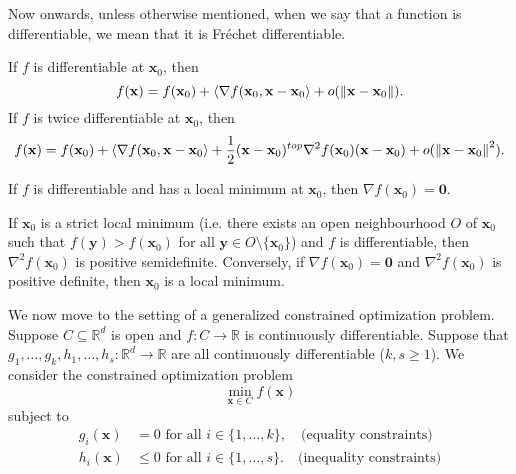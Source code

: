 Now onwards, unless otherwise mentioned, when we say that a function is differentiable, we mean that it is Fréchet differentiable.

\begin{prop}
    If $f$ is differentiable at $\mathbf{x}_0$, then 
    \[
        f(\mathbf{x}) = f(\mathbf{x}_0) + \left\langle \nabla f(\mathbf{x}_0, \mathbf{x} - \mathbf{x}_0 \right\rangle + o(\norm{\mathbf{x} - \mathbf{x}_0}).
    \]
    If $f$ is twice differentiable at $\mathbf{x}_0$, then 
    \[
        f(\mathbf{x}) = f(\mathbf{x}_0) + \left\langle \nabla f(\mathbf{x}_0, \mathbf{x} - \mathbf{x}_0 \right\rangle + \frac{1}{2} (\mathbf{x} - \mathbf{x}_0)^{top} \nabla^2 f(\mathbf{x}_0) (\mathbf{x} - \mathbf{x}_0) + o(\norm{\mathbf{x} - \mathbf{x}_0}^2).
    \]
\end{prop}

\begin{thm}
    If $f$ is differentiable and has a local minimum at $\mathbf{x}_0$, then $\nabla f(\mathbf{x}_0) = \mathbf{0}$.
\end{thm}

\begin{thm}
    If $\mathbf{x}_0$ is a strict local minimum (i.e. there exists an open neighbourhood $O$ of $\mathbf{x}_0$ such that $f(\mathbf{y}) > f(\mathbf{x}_0)$ for all $\mathbf{y} \in O \setminus \{\mathbf{x}_0\}$) and $f$ is differentiable, then $\nabla^2f(\mathbf{x}_0)$ is positive semidefinite. Conversely, if $\nabla f(\mathbf{x}_0) = \mathbf{0}$ and $\nabla^2f(\mathbf{x}_0)$ is positive definite, then $\mathbf{x}_0$ is a local minimum.
\end{thm}

We now move to the setting of a generalized constrained optimization problem. Suppose $C \subseteq \mathbb{R}^d$ is open and $f \colon C \to \mathbb{R}$ is continuously differentiable. Suppose that $g_1, \ldots, g_k, h_1, \ldots, h_s \colon \mathbb{R}^d \to \mathbb{R}$ are all continuously differentiable ($k,s \geq 1$). We consider the constrained optimization problem
\[
    \min_{\mathbf{x} \in C} f(\mathbf{x})
\]
subject to
\begin{align*}
    g_i(\mathbf{x}) &= 0 \text{ for all } i \in \{1,\ldots,k\}, \quad \text{(equality constraints)} \\
    h_i(\mathbf{x}) &\leq 0 \text{ for all } i \in \{1,\ldots,s\}. \quad \text{(inequality constraints)}
\end{align*}

